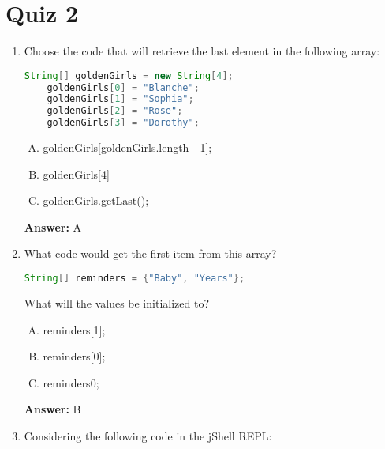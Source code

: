 \documentclass[12pt]{article}
\begin{document}
\bigskip

\section{Quiz 2}

\bigskip

\begin{enumerate}[1.]
    \item

    Choose the code that will retrieve the last element in the following array:

    \begin{lstlisting}[language=Java]
    String[] goldenGirls = new String[4];
    goldenGirls[0] = "Blanche";
    goldenGirls[1] = "Sophia";
    goldenGirls[2] = "Rose";
    goldenGirls[3] = "Dorothy";
    \end{lstlisting}

    \begin{enumerate}[A.]
        \item goldenGirls[goldenGirls.length - 1];
        \item goldenGirls[4]
        \item goldenGirls.getLast();
    \end{enumerate}

    \bigskip

    \textbf{Answer:} A

    \item

    What code would get the first item from this array?

    \begin{lstlisting}[language=Java]
    String[] reminders = {"Baby", "Years"};
    \end{lstlisting}

    What will the values be initialized to?

    \bigskip

    \begin{enumerate}[A.]
        \item reminders[1];
        \item reminders[0];
        \item reminders{0};
    \end{enumerate}

    \bigskip

    \textbf{Answer:} B

    \item Considering the following code in the jShell REPL:


\end{enumerate}
\end{document}
